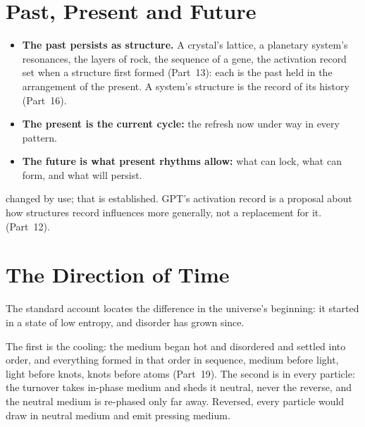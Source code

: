 \documentclass[11pt,a4paper]{article}
\begin{document}
\section{Past, Present and Future}
\label{sec:becoming}

\begin{itemize}
\item \textbf{The past persists as structure.} A crystal's lattice, a planetary system's resonances, the layers of rock, the sequence of a gene, the activation record set when a structure first formed (Part~13): each is the past held in the arrangement of the present. A system's structure is the record of its history (Part~16).
\item \textbf{The present is the current cycle:} the refresh now under way in every pattern.
\item \textbf{The future is what present rhythms allow:} what can lock, what can form, and what will persist.
\end{itemize}
 changed by use; that is established. GPT's activation record is a proposal about how structures record influences more generally, not a replacement for it.  (Part~12).

\section{The Direction of Time}
\label{sec:arrow}

 The standard account locates the difference in the universe's beginning: it started in a state of low entropy, and disorder has grown since.

 The first is the cooling: the medium began hot and disordered and settled into order, and everything formed in that order in sequence, medium before light, light before knots, knots before atoms (Part~19). The second is in every particle: the turnover takes in-phase medium and sheds it neutral, never the reverse, and the neutral medium is re-phased only far away. Reversed, every particle would draw in neutral medium and emit pressing medium. 
\end{document}

